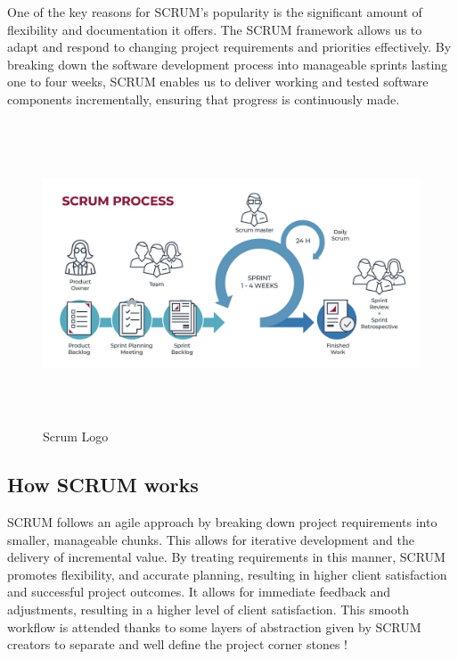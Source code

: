 One of the key reasons for SCRUM's popularity is the significant amount of flexibility and documentation it offers. The SCRUM framework allows us to adapt and respond to changing project requirements and priorities effectively. By breaking down the software development process into manageable sprints lasting one to four weeks, SCRUM enables us to deliver working and tested software components incrementally, ensuring that progress is continuously made.


\begin{figure}[H]
    \centering
    \includegraphics[height=9cm]{images/chap1/Scrum.jpg}
    \caption{Scrum Logo}
    \label{fig:enter-label}
\end{figure}

\subsection{How SCRUM works}
SCRUM follows an agile approach by breaking down project requirements into smaller, manageable chunks. This allows for iterative development and the delivery of incremental value. By treating requirements in this manner, SCRUM promotes flexibility, and accurate planning, resulting in higher client satisfaction and successful project outcomes. It allows for immediate feedback and adjustments, resulting in a higher level of client satisfaction.
This smooth workflow is attended thanks to some layers of abstraction given by SCRUM creators to separate and well define the project corner stones !

